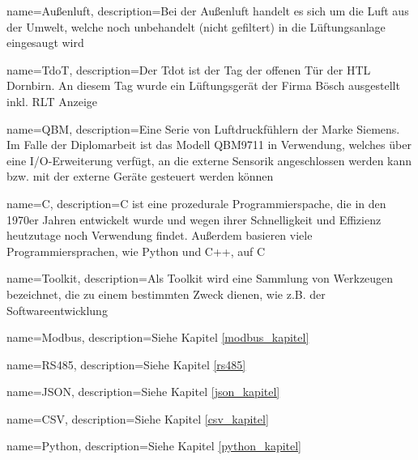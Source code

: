 {
	name=Außenluft,
	description={Bei der Außenluft handelt es sich um die Luft aus der Umwelt, welche noch unbehandelt (nicht gefiltert) in die Lüftungsanlage eingesaugt wird}
}

{
	name=TdoT,
	description={Der Tdot ist der Tag der offenen Tür der HTL Dornbirn. An diesem Tag wurde ein Lüftungsgerät der Firma Bösch ausgestellt inkl. RLT Anzeige}
}

{
	name=QBM,
	description={Eine Serie von Luftdruckfühlern der Marke Siemens. Im Falle der Diplomarbeit ist das Modell QBM9711 in Verwendung, welches über eine I/O-Erweiterung verfügt, an die externe Sensorik angeschlossen werden kann bzw. mit der externe Geräte gesteuert werden können}
}

{
	name=C,
	description={C ist eine prozedurale Programmierspache, die in den 1970er Jahren entwickelt wurde und wegen ihrer Schnelligkeit und Effizienz heutzutage noch Verwendung findet. Außerdem basieren viele Programmiersprachen, wie \zB Python und C++, auf C}
}

{
	name=Toolkit,
	description={Als Toolkit wird eine Sammlung von Werkzeugen bezeichnet, die zu einem bestimmten Zweck dienen, wie z.B. der Softwareentwicklung}
}

{
	name=Modbus,
	description={Siehe Kapitel \ref{modbus_kapitel} }
}

{
	name=RS485,
	description={Siehe Kapitel \ref{rs485} }
}

{
	name=JSON,
	description={Siehe Kapitel \ref{json_kapitel} }
}

{
	name=CSV,
	description={Siehe Kapitel \ref{csv_kapitel} }
}

{
	name=Python,
	description={Siehe Kapitel \ref{python_kapitel} }
}